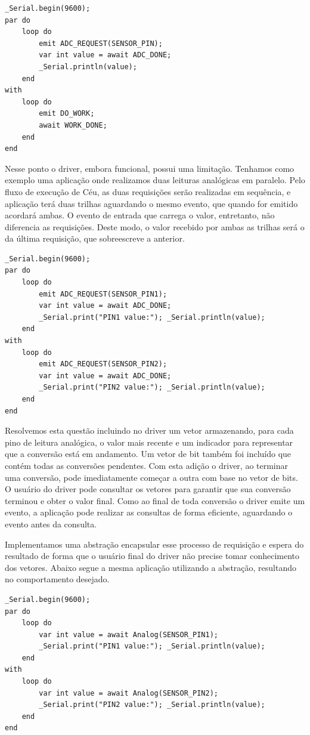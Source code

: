 \documentclass[11pt]{article}
\begin{document}
\begin{lstlisting}[style=CStyle,label=analogceu,caption=Aplicação utilizando driver em Céu]
_Serial.begin(9600);
par do
    loop do
        emit ADC_REQUEST(SENSOR_PIN);
        var int value = await ADC_DONE;
        _Serial.println(value);
    end
with
    loop do
        emit DO_WORK;
        await WORK_DONE;
    end
end
\end{lstlisting}
\par Nesse ponto o driver, embora funcional, possui uma limitação. Tenhamos como exemplo uma aplicação onde realizamos duas leituras analógicas em paralelo. Pelo fluxo de execução de Céu, as duas requisições serão realizadas em sequência, e aplicação terá duas trilhas aguardando o mesmo evento, que quando for emitido acordará ambas. O evento de entrada que carrega o valor, entretanto, não diferencia as requisições. Deste modo, o valor recebido por ambas as trilhas será o da última requisição, que sobreescreve a anterior.
\begin{lstlisting}[style=CStyle,label=analogceutwo1,caption=Duas leituras analógicas concorrentes não suportadas]
_Serial.begin(9600);
par do
    loop do
        emit ADC_REQUEST(SENSOR_PIN1);
        var int value = await ADC_DONE;
        _Serial.print("PIN1 value:"); _Serial.println(value);
    end
with
    loop do
        emit ADC_REQUEST(SENSOR_PIN2);
        var int value = await ADC_DONE;
        _Serial.print("PIN2 value:"); _Serial.println(value);
    end
end
\end{lstlisting}
\par Resolvemos esta questão incluindo no driver um vetor armazenando, para cada pino de leitura analógica, o valor mais recente e um indicador para representar que a conversão está em andamento. Um vetor de bit também foi incluído que contém todas as conversões pendentes. Com esta adição o driver, ao terminar uma conversão, pode imediatamente começar a outra com base no vetor de bits. O usuário do driver pode consultar os vetores para garantir que sua conversão terminou e obter o valor final. Como ao final de toda conversão o driver emite um evento, a aplicação pode realizar as consultas de forma eficiente, aguardando o evento antes da consulta. 
\par Implementamos uma abstração encapsular esse processo de requisição e espera do resultado de forma que o usuário final do driver não precise tomar conhecimento dos vetores. Abaixo segue a mesma aplicação utilizando a abstração, resultando no comportamento desejado.
\begin{lstlisting}[style=CStyle,label=analogceutwo2,caption=Duas leituras analógicas concorrentes utilizando a abstração]
_Serial.begin(9600);
par do
    loop do
        var int value = await Analog(SENSOR_PIN1);
        _Serial.print("PIN1 value:"); _Serial.println(value);
    end
with
    loop do
        var int value = await Analog(SENSOR_PIN2);
        _Serial.print("PIN2 value:"); _Serial.println(value);
    end
end
\end{lstlisting}
\end{document}
